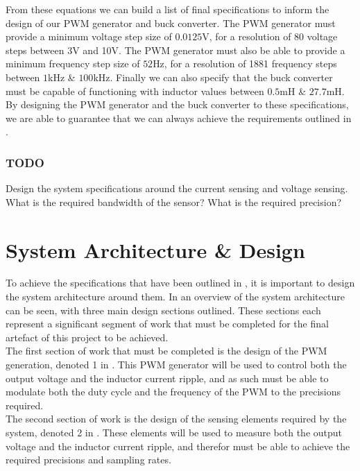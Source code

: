 From these equations we can build a list of final specifications to inform the design of our PWM generator and buck converter. The PWM generator must provide a minimum voltage step size of $0.0125$V, for a resolution of 80 voltage steps between 3V and 10V. The PWM generator must also be able to provide a minimum frequency step size of $52$Hz, for a resolution of 1881 frequency steps between $1$kHz \& $100$kHz. Finally we can also specify that the buck converter must be capable of functioning with inductor values between $0.5$mH \& $27.7$mH. \\

By designing the PWM generator and the buck converter to these specifications, we are able to guarantee that we can always achieve the requirements outlined in .\\


\subsubsection{TODO}
Design the system specifications around the current sensing and voltage sensing. What is the required bandwidth of the sensor? What is the required precision?


\section{System Architecture \& Design}\label{S:system}

To achieve the specifications that have been outlined in , it is important to design the system architecture around them. In  an overview of the system architecture can be seen, with three main design sections outlined. These sections each represent a significant segment of work that must be completed for the final artefact of this project to be achieved. \\

The first section of work that must be completed is the design of the PWM generation, denoted 1 in . This PWM generator will be used to control both the output voltage and the inductor current ripple, and as such must be able to modulate both the duty cycle and the frequency of the PWM to the precisions required. \\

The second section of work is the design of the sensing elements required by the system, denoted 2 in . These elements will be used to measure both the output voltage and the inductor current ripple, and therefor must be able to achieve the required precisions and sampling rates. \\

